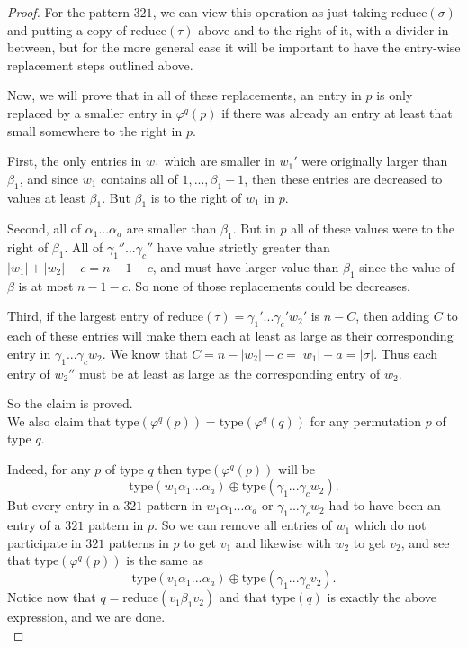 \documentclass[11pt]{amsart}
\theoremstyle{remark}
\numberwithin{equation}{section}
\begin{document}
\begin{proof}
For the pattern $321$, we can view this operation as just taking $\text{reduce}(\sigma)$ and putting a copy of $\text{reduce}(\tau)$ above and to the right of it, with a divider in-between, but for the more general case it will be important to have the entry-wise replacement steps outlined above.

\vspace{10pt}
Now, we will prove that in all of these replacements, an entry in $p$ is only replaced by a smaller entry in $\varphi^q(p)$ if there was already an entry at least that small somewhere to the right in $p$.

First, the only entries in $w_1$ which are smaller in $w_1'$ were originally larger than $\beta_1$, and since $w_1$ contains all of $1,...,\beta_1 - 1$, then these entries are decreased to values at least $\beta_1$. But $\beta_1$ is to the right of $w_1$ in $p$.

Second, all of $\alpha_1 ... \alpha_a$ are smaller than $\beta_1$. But in $p$ all of these values were to the right of $\beta_1$. All of $\gamma_1'' ... \gamma_c''$ have value strictly greater than $|w_1| + |w_2| - c = n - 1 - c$, and must have larger value than $\beta_1$ since the value of $\beta$ is at most $n-1-c$. So none of those replacements could be decreases.

Third, if the largest entry of $\text{reduce}(\tau) = \gamma_1' ... \gamma_c' w_2'$ is $n-C$, then adding $C$ to each of these entries will make them each at least as large as their corresponding entry in $\gamma_1 ... \gamma_c w_2$. We know that $C = n - |w_2| - c = |w_1| + a = |\sigma|$. Thus each entry of $w_2''$ must be at least as large as the corresponding entry of $w_2$.

So the claim is proved.
\\

We also claim that $\text{type}(\varphi^q(p)) = \text{type}(\varphi^q(q))$ for any permutation $p$ of type $q$.

Indeed, for any $p$ of type $q$ then $\text{type}(\varphi^q(p))$ will be 
\[
\text{type}(w_1\alpha_1 ... \alpha_a) \oplus \text{type}(\gamma_1 ... \gamma_c w_2).
\]
But every entry in a $321$ pattern in $w_1\alpha_1 ... \alpha_a$ or $\gamma_1 ... \gamma_c w_2$ had to have been an entry of a $321$  pattern in $p$. So we can remove all entries of $w_1$ which do not participate in $321$ patterns in $p$ to get $v_1$ and likewise with $w_2$ to get $v_2$, and see that $\text{type}(\varphi^q(p))$ is the same as
\[
\text{type}(v_1\alpha_1 ... \alpha_a) \oplus \text{type}(\gamma_1 ... \gamma_c v_2).
\]
Notice now that $q = \text{reduce}(v_1 \beta_1 v_2)$ and that $\text{type}(q)$ is exactly the above expression, and we are done.
\\



\end{proof}
\end{document}
